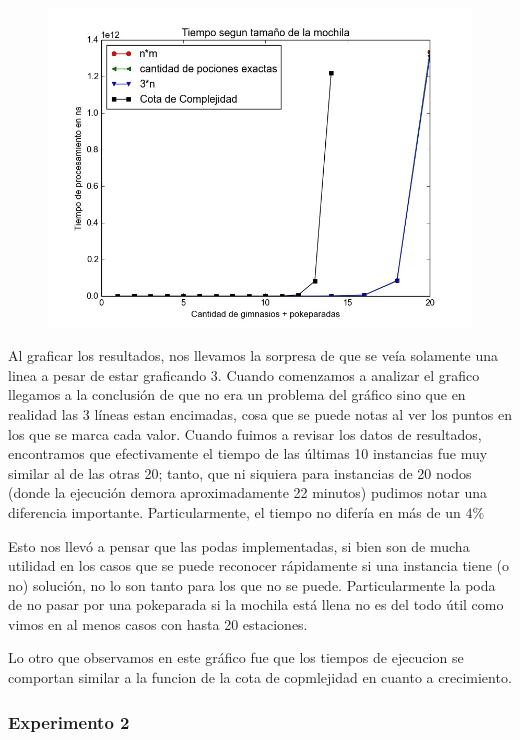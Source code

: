   \begin{figure}[H]
      \begin{center}
        \includegraphics[width=0.7\columnwidth]{imagenes/exp1_ej1.jpeg}
        \caption{}
      \end{center}
  \end{figure}

      Al graficar los resultados, nos llevamos la sorpresa de que se veía solamente una linea a pesar de estar graficando 3. Cuando comenzamos a analizar el grafico llegamos a la conclusión de que no era un problema del gráfico sino que en realidad las 3 líneas estan encimadas, cosa que se puede notas al ver los puntos en los que se marca cada valor. Cuando fuimos a revisar los datos de resultados, encontramos que efectivamente el tiempo de las últimas 10 instancias fue muy similar al de las otras 20; tanto, que ni siquiera para instancias de 20 nodos (donde la ejecución demora aproximadamente 22 minutos) pudimos notar una diferencia importante. Particularmente, el tiempo no difería en más de un $4\%$

      Esto nos llevó a pensar que las podas implementadas, si bien son de mucha utilidad en los casos que se puede reconocer rápidamente si una instancia tiene (o no) solución, no lo son tanto para los que no se puede. Particularmente la poda de no pasar por una pokeparada si la mochila está llena no es del todo útil como vimos en al menos casos con hasta 20 estaciones.

      Lo otro que observamos en este gráfico fue que los tiempos de ejecucion se comportan similar a la funcion de la cota de copmlejidad en cuanto a crecimiento.

    \subsubsection{Experimento 2}


